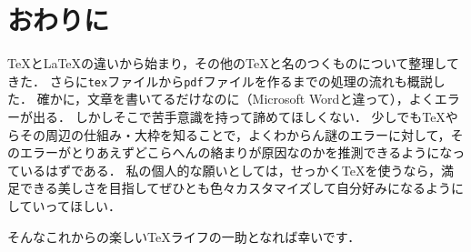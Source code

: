 \documentclass[./main]{subfiles}
\begin{document}
\section{おわりに}
\noindent
\TeX と\LaTeX の違いから始まり，その他の\TeX と名のつくものについて整理してきた．
さらに\verb|tex|ファイルから\verb|pdf|ファイルを作るまでの処理の流れも概説した．
確かに，文章を書いてるだけなのに（Microsoft Wordと違って），よくエラーが出る．
しかしそこで苦手意識を持って諦めてほしくない．
少しでも\TeX やらその周辺の仕組み・大枠を知ることで，よくわからん謎のエラーに対して，そのエラーがとりあえずどこらへんの絡まりが原因なのかを推測できるようになっているはずである．
私の個人的な願いとしては，せっかく\TeX を使うなら，満足できる美しさを目指してぜひとも色々カスタマイズして自分好みになるようにしていってほしい．

そんなこれからの楽しい\TeX ライフの一助となれば幸いです．

\ifSubfilesClassLoaded{%
  \printbibliography
}{}
\end{document}

